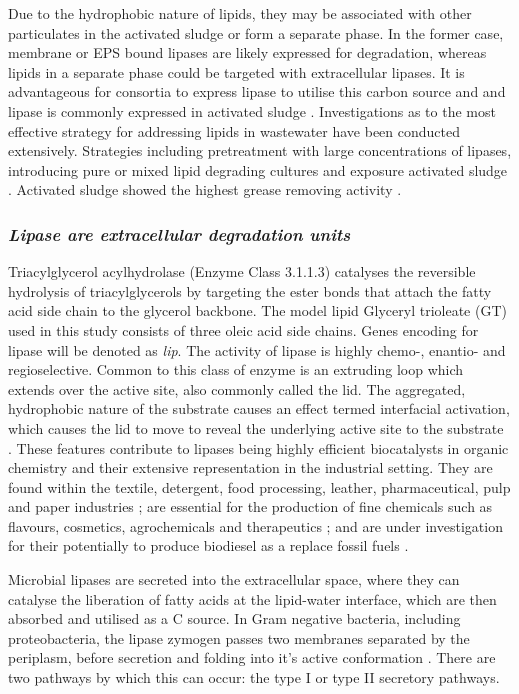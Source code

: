\documentclass[11pt]{article}
\begin{document}
Due to the hydrophobic nature of lipids, they may be associated with other particulates in the activated sludge or form a separate phase. In the former case, membrane or EPS bound lipases are likely expressed for degradation, whereas lipids in a separate phase could be targeted with extracellular lipases. It is advantageous for consortia to express lipase to utilise this carbon source and and lipase is commonly expressed in activated sludge \cite{gessesse2003lipase}. Investigations as to the most effective strategy for addressing lipids in wastewater have been conducted extensively. Strategies including pretreatment with large concentrations of lipases, introducing pure or mixed lipid degrading cultures and exposure activated sludge \cite{Wakelin_97}. Activated sludge showed the highest grease removing activity \cite{Wakelin_97}. 




\subsubsection{\emph{Lipase are extracellular degradation units}}
Triacylglycerol acylhydrolase (Enzyme Class 3.1.1.3) catalyses the reversible hydrolysis of triacylglycerols by targeting the ester bonds that attach the fatty acid side chain to the glycerol backbone. The model lipid Glyceryl trioleate (GT) used in this study consists of three oleic acid side chains. Genes encoding for lipase will be denoted as \emph{lip}.
The activity of lipase is highly chemo-, enantio- and regioselective. Common to this class of enzyme is an extruding loop which extends over the active site, also commonly called the lid. The aggregated, hydrophobic nature of the substrate causes an effect termed interfacial activation, which causes the lid to move to reveal the underlying active site to the substrate \cite{derewenda1992,van_Tilbeurgh1993}. These features contribute to lipases being highly efficient biocatalysts in organic chemistry and their extensive representation in the industrial setting. 
They are found within the textile, detergent, food processing, leather, pharmaceutical, pulp and paper industries \cite{hasan_06}; are essential for the production of fine chemicals such as flavours, cosmetics, agrochemicals and therapeutics \cite{jaeger2002}; and are under investigation for their potentially to produce biodiesel as a replace fossil fuels \cite{hasan_06,iso2001}. 


Microbial lipases are secreted into the extracellular space, where they can catalyse the liberation of fatty acids at the lipid-water interface, which are then absorbed and utilised as a C source. In Gram negative bacteria, including proteobacteria, the lipase zymogen passes two membranes separated by the periplasm, before secretion and folding into it's active conformation \cite{bos2007,michel2009}. There are two pathways by which this can occur: the type I or type II secretory pathways. 
\end{document}

